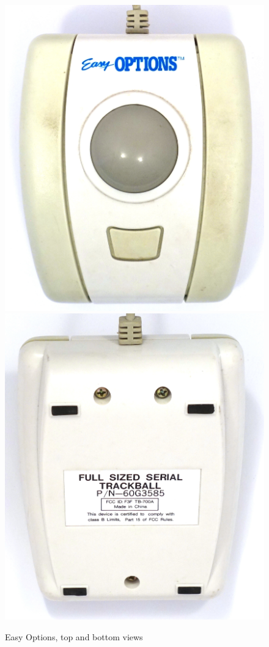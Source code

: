 \documentclass[11pt, a4paper]{article}
\begin{document}
\begin{figure}[h]
    \centering
    \includegraphics[scale=0.6]{1993_easy_options_trackball/top_60.jpg}
    \includegraphics[scale=0.6]{1993_easy_options_trackball/bottom_60.jpg}
    \caption{Easy Options, top and bottom views}
    \label{fig:EasyOptionsTopBottom}
\end{figure}
\end{document}
